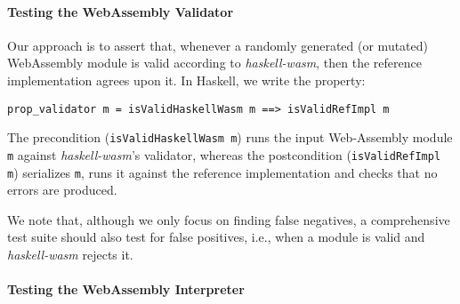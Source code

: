 \documentclass[sigconf,review,anonymous]{acmart}
\begin{document}

\paragraph{Testing the WebAssembly Validator}

Our approach is to assert that, whenever a randomly generated (or mutated)
WebAssembly module is valid according to \textit{haskell-wasm}, then the
reference implementation agrees upon it.
%
%
In Haskell, we write the property:

\begin{verbatim}
prop_validator m = isValidHaskellWasm m ==> isValidRefImpl m
\end{verbatim}

\noindent The precondition (\texttt{isValidHaskellWasm m}) runs the input
{Web-Assembly} module \texttt{m} against \textit{haskell-wasm}'s validator,
whereas the postcondition (\texttt{isValidRefImpl m}) serializes \texttt{m},
runs it against the reference implementation and checks that no errors are
produced.

We note that, although we only focus on finding false negatives, a comprehensive
test suite should also test for false positives, i.e., when a module is valid
and \textit{haskell-wasm} rejects it.
%
%




\paragraph{Testing the WebAssembly Interpreter}
\end{document}
